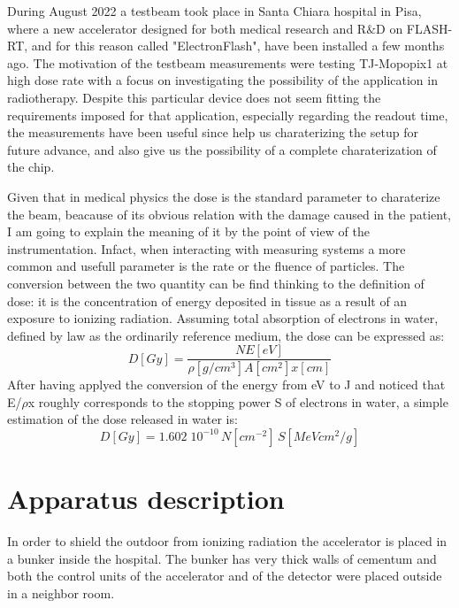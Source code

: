 During August 2022 a testbeam took place in Santa Chiara hospital in Pisa, where a new accelerator designed for both medical research and R$\&$D on FLASH-RT, and for this reason called "ElectronFlash", have been installed a few months ago. 
The motivation of the testbeam measurements were testing TJ-Mopopix1 at high dose rate with a focus on investigating the possibility of the application in radiotherapy. Despite this particular device does not seem fitting the requirements imposed for that application, especially regarding the readout time, the measurements have been useful since help us charaterizing the setup for future advance, and also give us the possibility of a complete charaterization of the chip.

Given that in medical physics the dose is the standard parameter to charaterize the beam, beacause of its obvious relation with the damage caused in the patient, I am going to explain the meaning of it by the point of view of the instrumentation.
Infact, when interacting with measuring systems a more common and usefull parameter is the rate or the fluence of particles.
The conversion between the two quantity can be find thinking to the definition of dose: it is the concentration of energy deposited in tissue as a result of an exposure to ionizing radiation. 
Assuming total absorption of electrons in water, defined by law as the ordinarily reference medium, the dose can be expressed as: 
\begin{equation}
   D[Gy] = \frac{N E[eV]}{\rho[g/cm^3] A[cm^2] x[cm]}
\end{equation}
After having applyed the conversion of the energy from \si{eV} to \si{J} and noticed that E/$\rho$x roughly corresponds to the stopping power S of electrons in water, a simple estimation of the dose released in water is:
\begin{equation}
   D[Gy] = 1.602\;10^{-10}\,N[cm^{-2}]\,S[MeV cm^2/g]
\end{equation}


\section{Apparatus description}
   In order to shield the outdoor from ionizing radiation the accelerator is placed in a bunker inside the hospital. The bunker has very thick walls of cementum and both the control units of the accelerator and of the detector were placed outside in a neighbor room. 
